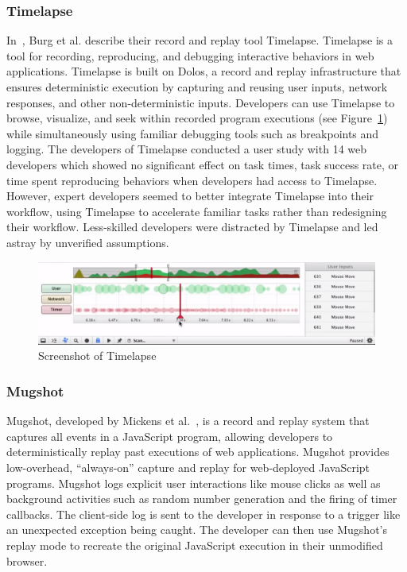 \subsubsection{Timelapse}

In~\cite{timelapse2013}, Burg et al. describe their record and replay tool Timelapse. Timelapse is a tool for recording, reproducing, and debugging interactive behaviors in web applications. Timelapse is built on Dolos, a record and replay infrastructure that ensures deterministic execution by capturing and reusing user inputs, network responses, and other non-deterministic inputs. Developers can use Timelapse to browse, visualize, and seek within recorded program executions (see Figure~\ref{fig:timelapse}) while simultaneously using familiar debugging tools such as breakpoints and logging. The developers of Timelapse conducted a user study with 14 web developers which showed no significant effect on task times, task success rate, or time spent reproducing behaviors when developers had access to Timelapse. However, expert developers seemed to better integrate Timelapse into their workflow, using Timelapse to accelerate familiar tasks rather than redesigning their workflow. Less-skilled developers were distracted by Timelapse and led astray by unverified assumptions.

\begin{figure}[H]
  \centering
    \includegraphics[width=1.0\textwidth]{images/relatedwork/timelapse.png}
	\caption[Screenshot: Timelapse]{Screenshot of Timelapse}
	\label{fig:timelapse}
\end{figure}

\subsubsection{Mugshot}

Mugshot, developed by Mickens et al.~\cite{mugshot2010}, is a record and replay system that captures all events in a JavaScript program, allowing developers to deterministically replay past executions of web applications. Mugshot provides low-overhead, ``always-on'' capture and replay for web-deployed JavaScript programs. Mugshot logs explicit user interactions like mouse clicks as well as background activities such as random number generation and the firing of timer callbacks. The client-side log is sent to the developer in response to a trigger like an unexpected exception being caught. The developer can then use Mugshot's replay mode to recreate the original JavaScript execution in their unmodified browser. 

